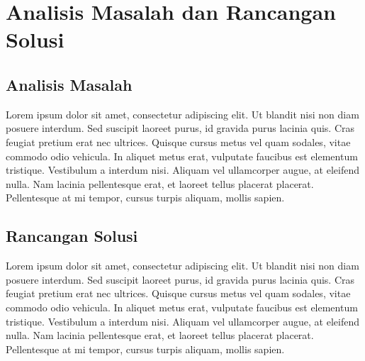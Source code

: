 
\chapter{Analisis Masalah dan Rancangan Solusi}

\section{Analisis Masalah}

Lorem ipsum dolor sit amet, consectetur adipiscing elit. Ut blandit nisi non diam posuere interdum. Sed suscipit laoreet purus, id gravida purus lacinia quis. Cras feugiat pretium erat nec ultrices. Quisque cursus metus vel quam sodales, vitae commodo odio vehicula. In aliquet metus erat, vulputate faucibus est elementum tristique. Vestibulum a interdum nisi. Aliquam vel ullamcorper augue, at eleifend nulla. Nam lacinia pellentesque erat, et laoreet tellus placerat placerat. Pellentesque at mi tempor, cursus turpis aliquam, mollis sapien.

\section{Rancangan Solusi}

Lorem ipsum dolor sit amet, consectetur adipiscing elit. Ut blandit nisi non diam posuere interdum. Sed suscipit laoreet purus, id gravida purus lacinia quis. Cras feugiat pretium erat nec ultrices. Quisque cursus metus vel quam sodales, vitae commodo odio vehicula. In aliquet metus erat, vulputate faucibus est elementum tristique. Vestibulum a interdum nisi. Aliquam vel ullamcorper augue, at eleifend nulla. Nam lacinia pellentesque erat, et laoreet tellus placerat placerat. Pellentesque at mi tempor, cursus turpis aliquam, mollis sapien.
